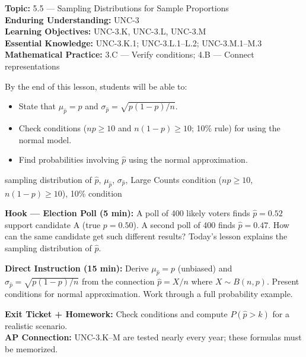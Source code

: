 \documentclass[10pt]{article}
\begin{document}

\begin{objectivebox}
\textbf{Topic:} 5.5 — Sampling Distributions for Sample Proportions\\
\textbf{Enduring Understanding:} UNC-3\\
\textbf{Learning Objectives:} UNC-3.K, UNC-3.L, UNC-3.M\\
\textbf{Essential Knowledge:} UNC-3.K.1; UNC-3.L.1--L.2; UNC-3.M.1--M.3\\
\textbf{Mathematical Practice:} 3.C — Verify conditions; 4.B — Connect representations
\end{objectivebox}

\begin{learningtargetbox}
By the end of this lesson, students will be able to:
\begin{itemize}
  \item State that $\mu_{\hat{p}} = p$ and $\sigma_{\hat{p}} = \sqrt{p(1-p)/n}$.
  \item Check conditions ($np \ge 10$ and $n(1-p) \ge 10$; 10\% rule) for using the normal model.
  \item Find probabilities involving $\hat{p}$ using the normal approximation.
\end{itemize}
\end{learningtargetbox}

\begin{vocabbox}
sampling distribution of $\hat{p}$, $\mu_{\hat{p}}$, $\sigma_{\hat{p}}$, Large Counts condition ($np \ge 10$, $n(1-p) \ge 10$), 10\% condition
\end{vocabbox}

\begin{hookbox}
\textbf{Hook — Election Poll (5 min):} A poll of 400 likely voters finds $\hat{p} = 0.52$ support candidate A (true $p = 0.50$). A second poll of 400 finds $\hat{p} = 0.47$. How can the same candidate get such different results? Today's lesson explains the sampling distribution of $\hat{p}$.
\end{hookbox}

\begin{notesbox}
\textbf{Direct Instruction (15 min):} Derive $\mu_{\hat{p}} = p$ (unbiased) and $\sigma_{\hat{p}} = \sqrt{p(1-p)/n}$ from the connection $\hat{p} = X/n$ where $X \sim B(n, p)$. Present conditions for normal approximation. Work through a full probability example.
\end{notesbox}

\begin{reflectionbox}
\textbf{Exit Ticket + Homework:} Check conditions and compute $P(\hat{p} > k)$ for a realistic scenario.\\
\textbf{AP Connection:} UNC-3.K--M are tested nearly every year; these formulas must be memorized.
\end{reflectionbox}
\end{document}
